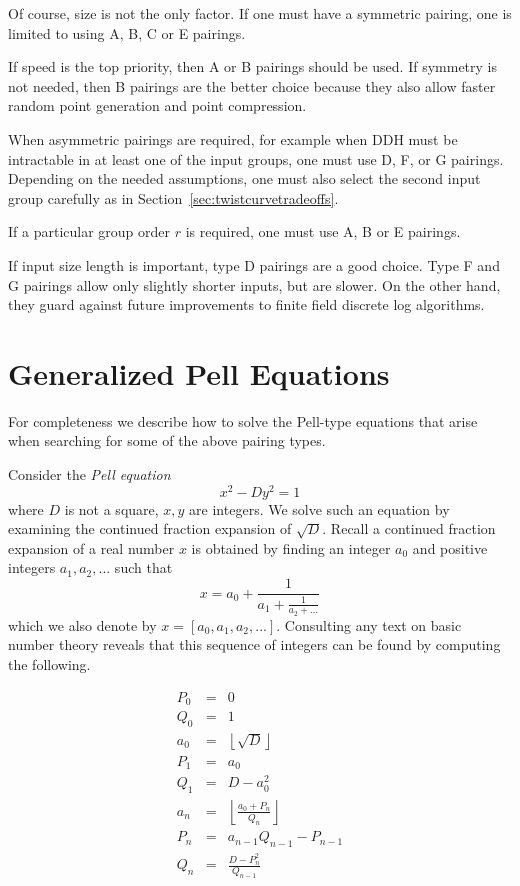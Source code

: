 Of course, size is not the only factor. If one must have
a symmetric pairing, one is limited to using A, B, C or E pairings.

If speed is the top priority, then A or B pairings should be used. If symmetry
is not needed, then B pairings are the better choice because
they also allow faster random point generation and point compression.

When asymmetric pairings are required, for example when DDH must be intractable
in at least one of the input groups, one must use D, F, or G pairings.
Depending on the needed assumptions, one must also select the second input
group carefully as in Section~\ref{sec:twistcurvetradeoffs}.

If a particular group order $r$ is required, one must use A, B or E pairings.

If input size length is important, type D pairings are a good choice.
Type F and G pairings allow only slightly shorter inputs, but are slower.
On the other hand, they guard against future improvements to
finite field discrete log algorithms.

\section{\label{sec:pelleqn}Generalized Pell Equations}

For completeness we describe how to solve the Pell-type equations that arise
when searching for some of the above pairing types.

Consider the \emph{Pell equation}
\[ x^2 - D y^2 = 1 \]
where $D$ is not a square, $x, y$ are integers.
We solve such an equation by examining the
continued fraction expansion of $\sqrt{D}$.
Recall a continued fraction expansion of a real number $x$
is obtained by finding
an integer $a_0$ and positive integers $a_1, a_2, ...$ such that
\[
x = a_0 + \frac{1}{a_1 + \frac{1}{a_2 + ...}}
\]
which we also denote by $x = [a_0,a_1,a_2,...]$.
Consulting any text on basic number theory reveals that
this sequence of integers can be found by computing the following.

\[
\begin{array}{rcl}
P_0 &=& 0 \\
Q_0 &=& 1 \\
a_0 &=& \left\lfloor{\sqrt{D}}\right\rfloor \\
P_1 &=& a_0 \\
Q_1 &=& D-a_0^2 \\
a_n &=& \left\lfloor { \frac {a_0 + P_n}{Q_n} } \right\rfloor \\
P_n &=& a_{n-1} Q_{n-1} - P_{n-1} \\
Q_n &=& \frac{D - P_n^2}{Q_{n-1}}
\end{array}
\]

